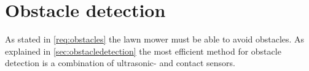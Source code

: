 \section{Obstacle detection}
As stated in \autoref{req:obstacles} the lawn mower must be able to avoid obstacles. As explained in \autoref{sec:obstacledetection} the most efficient method for obstacle detection is a combination of ultrasonic- and contact sensors.


